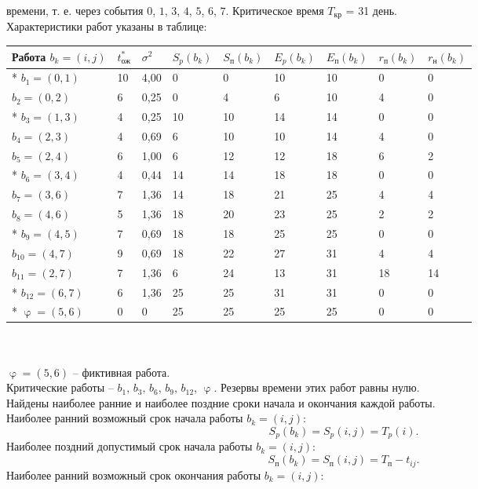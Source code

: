 \documentclass[a4paper, 12pt]{report}
\renewcommand{\varphi}{\upvarphi}
\begin{document}
	времени, т. е. через события $0$, $1$, $3$, $4$, $5$, $6$, $7$. Критическое время $T_\text{кр}$ = 31
	день.\\
	Характеристики работ указаны в таблице: \\
	\begin{tabular}{ |p{4cm}||p{1cm}||p{1cm}||p{1cm}||p{1cm}||p{1cm}||p{1cm}||p{1cm}||p{1cm}|  }
		\hline
		Работа $b_k=(i,j)$& $t_\text{ож}^*$& $\sigma^2$ & $S_p(b_k)$ & $S_\text{п}(b_k)$ & $E_p(b_k)$ & $E_\text{п}(b_k)$ & $r_\text{п}(b_k)$ & $r_\text{н}(b_k)$\\
		\hline
		* $b_1=(0,1)$ & 10 & 4,00 & 0 & 0 & 10 & 10 &0&0\\
		\;\;\;$b_2=(0,2)$ & 6 & 0,25 & 0 & 4 & 6 & 10 &4&0\\
		* $b_3=(1,3)$ & 4 & 0,25 & 10 & 10 & 14 & 14&0&0 \\
		\;\;\;$b_4=(2,3)$ & 4 & 0,69 & 6 & 10 & 10 & 14 &4&0\\
		\;\;\;$b_5=(2,4)$ & 6 & 1,00 & 6 & 12 & 12 & 18 &6&2\\
		* $b_6=(3,4)$ & 4 & 0,44 & 14 & 14 & 18 & 18 &0&0\\
		\;\;\;$b_7=(3,6)$ & 7 & 1,36 & 14 &  18 & 21 & 25 &4&4\\
		\;\;\;$b_8=(4,6)$ & 5 & 1,36 & 18 & 20 & 23 &25&2&2\\
		* $b_9=(4,5)$ & 7 & 0,69 & 18 & 18 & 25 &25&0&0\\
		\;\;\;$b_{10}=(4,7)$ & 9 & 0,69 & 18 & 22 & 27 &31&4&4\\
		\;\;\;$b_{11}=(2,7)$ & 7 & 1,36 & 6 & 24 & 13 & 31&18&14\\
		* $b_{12}=(6,7)$ & 6 & 1,36 & 25 & 25 & 31 &31&0&0\\
		* $\varphi=(5,6)$ & 0 & 0 & 25 & 25 & 25 &25&0&0\\
		\hline
	\end{tabular}\\\\
	$\varphi=(5,6)$ -- фиктивная работа.\\
	Критические работы -- $b_1$, $b_3$, $b_6$, $b_9$, $b_{12}$, $\varphi$. Резервы времени этих работ равны нулю.\\
	Найдены наиболее ранние и наиболее поздние сроки начала и
	окончания каждой работы. \\
	Наиболее ранний возможный срок начала работы $b_k = (i,j)$:
	$$S_p(b_k)=S_p(i,j)=T_p(i).$$
	Наиболее поздний допустимый срок начала работы $b_k=(i,j)$:
	$$S_\text{п}(b_k)=S_\text{п}(i,j)=T_\text{п}-t_{ij}.$$
	Наиболее ранний возможный срок окончания работы $b_k=(i,j)$:
\end{document}
